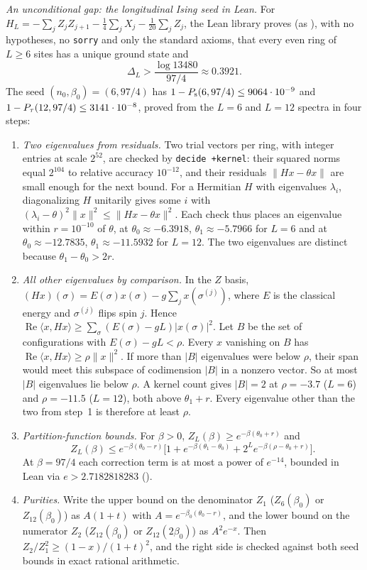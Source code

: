\documentclass[aps,prl,reprint,amsmath,amssymb,nofootinbib,raggedbottom]{revtex4-2}
\begin{document}
\emph{An unconditional gap: the longitudinal Ising seed in Lean.}
For $H_L=-\sum_jZ_jZ_{j+1}-\tfrac14\sum_jX_j-\tfrac1{20}\sum_jZ_j$, the
Lean library  proves (as ), with no hypotheses, no
\texttt{sorry} and only the standard axioms, that every even ring of
$L\ge6$ sites has a unique ground state and
\begin{equation}
\Delta_L>\frac{\log13480}{97/4}\approx0.3921.
\label{eq:isinggap}
\end{equation}
The seed $(n_0,\beta_0)=(6,97/4)$ has
$1-P_{\mathrm s}(6,97/4)\le9064\cdot10^{-9}$ and $1-P_{\tau}(12,97/4)\le3141\cdot10^{-8}$,
proved from the $L=6$ and $L=12$ spectra in four steps:
\begin{enumerate}
\item \emph{Two eigenvalues from residuals.} Two trial vectors per ring, with
integer entries at scale $2^{52}$, are checked by \texttt{decide +kernel}:
their squared norms equal $2^{104}$ to relative accuracy $10^{-12}$, and their
residuals $\|Hx-\theta x\|$ are small enough for the next bound. For a
Hermitian $H$ with eigenvalues $\lambda_i$, diagonalizing $H$ unitarily gives
some $i$ with $(\lambda_i-\theta)^2\|x\|^2\le\|Hx-\theta x\|^2$. Each check
thus places an eigenvalue within $r=10^{-10}$ of $\theta$, at
$\theta_0\approx-6.3918$, $\theta_1\approx-5.7966$ for $L=6$ and at
$\theta_0\approx-12.7835$, $\theta_1\approx-11.5932$ for $L=12$. The two
eigenvalues are distinct because $\theta_1-\theta_0>2r$.
\item \emph{All other eigenvalues by comparison.} In the $Z$ basis,
$(Hx)(\sigma)=E(\sigma)x(\sigma)-g\sum_jx(\sigma^{(j)})$, where $E$ is the
classical energy and $\sigma^{(j)}$ flips spin $j$. Hence
$\operatorname{Re}\langle x,Hx\rangle\ge\sum_\sigma(E(\sigma)-gL)|x(\sigma)|^2$.
Let $B$ be the set of configurations with $E(\sigma)-gL<\rho$. Every $x$
vanishing on $B$ has $\operatorname{Re}\langle x,Hx\rangle\ge\rho\|x\|^2$.
If more than $|B|$ eigenvalues were below $\rho$, their span would meet this
subspace of codimension $|B|$ in a nonzero vector. So at most $|B|$
eigenvalues lie below $\rho$. A kernel count gives $|B|=2$ at $\rho=-3.7$
($L=6$) and $\rho=-11.5$ ($L=12$), both above $\theta_1+r$. Every eigenvalue
other than the two from step~1 is therefore at least $\rho$.
\item \emph{Partition-function bounds.} For $\beta>0$,
$Z_L(\beta)\ge e^{-\beta(\theta_0+r)}$ and
\[
Z_L(\beta)\le e^{-\beta(\theta_0-r)}\bigl[1+e^{-\beta(\theta_1-\theta_0)}
+2^Le^{-\beta(\rho-\theta_0+r)}\bigr].
\]
At $\beta=97/4$ each correction term is at most a power of $e^{-14}$, bounded
in Lean via $e>2.7182818283$ ().
\item \emph{Purities.} Write the upper bound on the denominator $Z_1$
($Z_6(\beta_0)$ or $Z_{12}(\beta_0)$) as $A(1+t)$ with $A=e^{-\beta_0(\theta_0-r)}$, and
the lower bound on the numerator $Z_2$ ($Z_{12}(\beta_0)$ or $Z_{12}(2\beta_0)$) as
$A^2e^{-x}$. Then $Z_2/Z_1^2\ge(1-x)/(1+t)^2$, and the right side is checked
against both seed bounds in exact rational arithmetic.
\end{enumerate}
\end{document}
